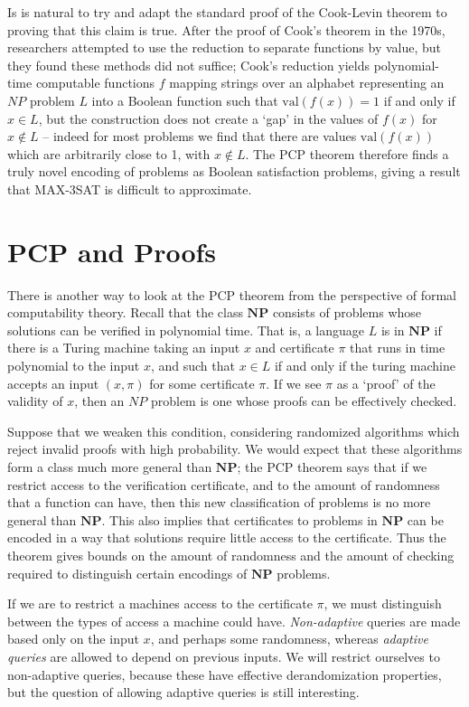 Is is natural to try and adapt the standard proof of the Cook-Levin theorem to proving that this claim is true. After the proof of Cook's theorem in the 1970s, researchers attempted to use the reduction to separate functions by value, but they found these methods did not suffice; Cook's reduction yields polynomial-time computable functions $f$ mapping strings over an alphabet representing an $NP$ problem $L$ into a Boolean function such that $\text{val}(f(x)) = 1$ if and only if $x \in L$, but the construction does not create a `gap' in the values of $f(x)$ for $x \not \in L$ -- indeed for most problems we find that there are values $\text{val}(f(x))$ which are arbitrarily close to 1, with $x \not \in L$. The PCP theorem therefore finds a truly novel encoding of problems as Boolean satisfaction problems, giving a result that MAX-3SAT is difficult to approximate.

\section{PCP and Proofs}

There is another way to look at the PCP theorem from the perspective of formal computability theory. Recall that the class $\mathbf{NP}$ consists of problems whose solutions can be verified in polynomial time. That is, a language $L$ is in $\mathbf{NP}$ if there is a Turing machine taking an input $x$ and certificate $\pi$ that runs in time polynomial to the input $x$, and such that $x \in L$ if and only if the turing machine accepts an input $(x, \pi)$ for some certificate $\pi$. If we see $\pi$ as a `proof' of the validity of $x$, then an $NP$ problem is one whose proofs can be effectively checked.

Suppose that we weaken this condition, considering randomized algorithms which reject invalid proofs with high probability. We would expect that these algorithms form a class much more general than $\mathbf{NP}$; the PCP theorem says that if we restrict access to the verification certificate, and to the amount of randomness that a function can have, then this new classification of problems is no more general than $\mathbf{NP}$. This also implies that certificates to problems in $\mathbf{NP}$ can be encoded in a way that solutions require little access to the certificate. Thus the theorem gives bounds on the amount of randomness and the amount of checking required to distinguish certain encodings of $\mathbf{NP}$ problems.

If we are to restrict a machines access to the certificate $\pi$, we must distinguish between the types of access a machine could have. \emph{Non-adaptive} queries are made based only on the input $x$, and perhaps some randomness, whereas \emph{adaptive queries} are allowed to depend on previous inputs. We will restrict ourselves to non-adaptive queries, because these have effective derandomization properties, but the question of allowing adaptive queries is still interesting.


